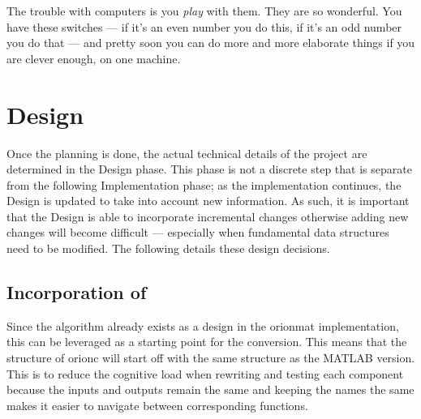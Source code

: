 \begin{savequote}[0.55\linewidth]
	\begin{fancyquote}
		The trouble with computers is you \emph{play} with them. They are so
		wonderful. You have these switches --- if it's an even number you do
		this, if it's an odd number you do that --- and pretty soon you can
		do more and more elaborate things if you are clever enough, on one
		machine.
	\end{fancyquote}
\end{savequote}
\chapter{Design}\label{ch:design}

Once the planning is done, the actual technical details of the
project are determined in the Design phase. This phase is not a
discrete step that is separate from the following Implementation
phase; as the implementation continues, the Design is updated to
take into account new information. As such, it is important that
the Design is able to incorporate incremental changes otherwise
adding new changes will become difficult --- especially
when fundamental data structures need to be modified. The following
details these design decisions.

\section{Incorporation of }

Since the algorithm already exists as a design in the \gls{orionmat}
implementation, this can be leveraged as a starting point for the
conversion. This means that the structure of \gls{orionc} will
start off with the same structure as the MATLAB version. This is
to reduce the cognitive load when rewriting and testing each
component because the inputs and outputs remain the same and
keeping the names the same makes it easier to navigate between
corresponding functions.


